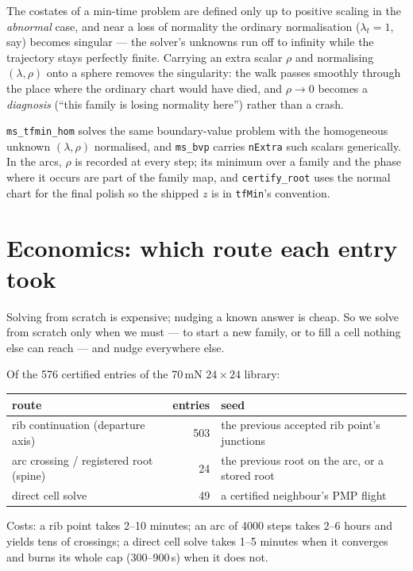 \documentclass[11pt]{article}
\newcommand{\file}[1]{\texttt{#1}}
\begin{document}
\begin{intu}
The costates of a min-time problem are defined only up to positive scaling in
the \emph{abnormal} case, and near a loss of normality the ordinary
normalisation ($\lambda_t=1$, say) becomes singular --- the solver's
unknowns run off to infinity while the trajectory stays perfectly finite.
Carrying an extra scalar $\rho$ and normalising $(\lambda,\rho)$ onto a
sphere removes the singularity: the walk passes smoothly through the place
where the ordinary chart would have died, and $\rho\to0$ becomes a
\emph{diagnosis} (``this family is losing normality here'') rather than a
crash.
\end{intu}

\begin{rig}
\file{ms\_tfmin\_hom} solves the same boundary-value problem with the
homogeneous unknown $(\lambda,\rho)$ normalised, and \file{ms\_bvp} carries
\file{nExtra} such scalars generically. In the arcs, $\rho$ is recorded at
every step; its minimum over a family and the phase where it occurs are part
of the family map, and \file{certify\_root} uses the normal chart for the
final polish so the shipped $z$ is in \file{tfMin}'s convention.
\end{rig}

\section{Economics: which route each entry took}

\begin{eli}
Solving from scratch is expensive; nudging a known answer is cheap. So we
solve from scratch only when we must --- to start a new family, or to fill a
cell nothing else can reach --- and nudge everywhere else.
\end{eli}

\begin{rig}
Of the 576 certified entries of the 70\,mN $24\times24$ library:
\begin{center}
\begin{tabular}{@{}lrl@{}}
\toprule
route & entries & seed \\
\midrule
rib continuation (departure axis) & 503 & the previous accepted rib point's junctions \\
arc crossing / registered root (spine) & 24 & the previous root on the arc, or a stored root \\
direct cell solve & 49 & a certified neighbour's PMP flight \\
\bottomrule
\end{tabular}
\end{center}
Costs: a rib point takes 2--10 minutes; an arc of 4000 steps takes 2--6
hours and yields tens of crossings; a direct cell solve takes 1--5 minutes
when it converges and burns its whole cap (300--900\,s) when it does not.
\end{rig}
\end{document}
